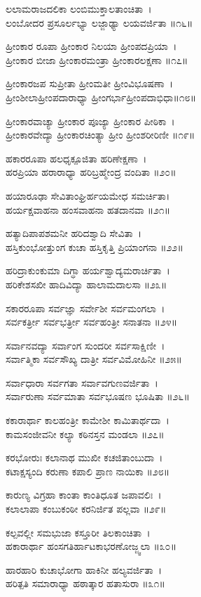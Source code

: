 {ಲಲಾಮರಾಜದಲಿಕಾ ಲಂಬಿಮುಕ್ತಾಲತಾಂಚಿತಾ~।\\
ಲಂಬೋದರ ಪ್ರಸೂರ್ಲಭ್ಯಾ ಲಜ್ಜಾಢ್ಯಾ ಲಯವರ್ಜಿತಾ ॥೧೬॥

ಹ್ರೀಂಕಾರ ರೂಪಾ ಹ್ರೀಂಕಾರ ನಿಲಯಾ ಹ್ರೀಂಪದಪ್ರಿಯಾ~।\\
ಹ್ರೀಂಕಾರ ಬೀಜಾ ಹ್ರೀಂಕಾರಮಂತ್ರಾ ಹ್ರೀಂಕಾರಲಕ್ಷಣಾ ॥೧೭॥

ಹ್ರೀಂಕಾರಜಪ ಸುಪ್ರೀತಾ ಹ್ರೀಂಮತೀ ಹ್ರೀಂವಿಭೂಷಣಾ~।\\
ಹ್ರೀಂಶೀಲಾಹ್ರೀಂಪದಾರಾಧ್ಯಾ ಹ್ರೀಂಗರ್ಭಾಹ್ರೀಂಪದಾಭಿಧಾ॥೧೮॥

ಹ್ರೀಂಕಾರವಾಚ್ಯಾ ಹ್ರೀಂಕಾರ ಪೂಜ್ಯಾ ಹ್ರೀಂಕಾರ ಪೀಠಿಕಾ~।\\
ಹ್ರೀಂಕಾರವೇದ್ಯಾ ಹ್ರೀಂಕಾರಚಿಂತ್ಯಾ ಹ್ರೀಂ ಹ್ರೀಂಶರೀರಿಣೀ ॥೧೯॥

ಹಕಾರರೂಪಾ ಹಲಧೃಕ್ಪೂಜಿತಾ ಹರಿಣೇಕ್ಷಣಾ~।\\
ಹರಪ್ರಿಯಾ ಹರಾರಾಧ್ಯಾ ಹರಿಬ್ರಹ್ಮೇಂದ್ರ ವಂದಿತಾ ॥೨೦॥

ಹಯಾರೂಢಾ ಸೇವಿತಾಂಘ್ರಿರ್ಹಯಮೇಧ ಸಮರ್ಚಿತಾ।\\
ಹರ್ಯಕ್ಷವಾಹನಾ ಹಂಸವಾಹನಾ ಹತದಾನವಾ ॥೨೧॥

ಹತ್ಯಾದಿಪಾಪಶಮನೀ ಹರಿದಶ್ವಾದಿ ಸೇವಿತಾ~।\\
ಹಸ್ತಿಕುಂಭೋತ್ತುಂಗ ಕುಚಾ ಹಸ್ತಿಕೃತ್ತಿ ಪ್ರಿಯಾಂಗನಾ ॥೨೨॥

ಹರಿದ್ರಾಕುಂಕುಮಾ ದಿಗ್ಧಾ ಹರ್ಯಶ್ವಾದ್ಯಮರಾರ್ಚಿತಾ~।\\
ಹರಿಕೇಶಸಖೀ ಹಾದಿವಿದ್ಯಾ ಹಾಲಾಮದಾಲಸಾ ॥೨೩॥

ಸಕಾರರೂಪಾ ಸರ್ವಜ್ಞಾ ಸರ್ವೇಶೀ ಸರ್ವಮಂಗಲಾ~।\\
ಸರ್ವಕರ್ತ್ರೀ ಸರ್ವಭರ್ತ್ರೀ ಸರ್ವಹಂತ್ರೀ ಸನಾತನಾ ॥೨೪॥

ಸರ್ವಾನವದ್ಯಾ ಸರ್ವಾಂಗ ಸುಂದರೀ ಸರ್ವಸಾಕ್ಷಿಣೀ~।\\
ಸರ್ವಾತ್ಮಿಕಾ ಸರ್ವಸೌಖ್ಯ ದಾತ್ರೀ ಸರ್ವವಿಮೋಹಿನೀ ॥೨೫॥

ಸರ್ವಾಧಾರಾ ಸರ್ವಗತಾ ಸರ್ವಾವಗುಣವರ್ಜಿತಾ~।\\
ಸರ್ವಾರುಣಾ ಸರ್ವಮಾತಾ ಸರ್ವಭೂಷಣ ಭೂಷಿತಾ ॥೨೬॥

ಕಕಾರಾರ್ಥಾ ಕಾಲಹಂತ್ರೀ ಕಾಮೇಶೀ ಕಾಮಿತಾರ್ಥದಾ~।\\
ಕಾಮಸಂಜೀವನೀ ಕಲ್ಯಾ ಕಠಿನಸ್ತನ ಮಂಡಲಾ ॥೨೭॥

ಕರಭೋರುಃ ಕಲಾನಾಥ ಮುಖೀ ಕಚಜಿತಾಂಬುದಾ~।\\
ಕಟಾಕ್ಷಸ್ಯಂದಿ ಕರುಣಾ ಕಪಾಲಿ ಪ್ರಾಣ ನಾಯಿಕಾ ॥೨೮॥

ಕಾರುಣ್ಯ ವಿಗ್ರಹಾ ಕಾಂತಾ ಕಾಂತಿಧೂತ ಜಪಾವಲಿಃ~।\\
ಕಲಾಲಾಪಾ ಕಂಬುಕಂಠೀ ಕರನಿರ್ಜಿತ ಪಲ್ಲವಾ ॥೨೯॥

ಕಲ್ಪವಲ್ಲೀ ಸಮಭುಜಾ ಕಸ್ತೂರೀ ತಿಲಕಾಂಚಿತಾ~।\\
ಹಕಾರಾರ್ಥಾ ಹಂಸಗತಿರ್ಹಾಟಕಾಭರಣೋಜ್ಜ್ವಲಾ ॥೩೦॥

ಹಾರಹಾರಿ ಕುಚಾಭೋಗಾ ಹಾಕಿನೀ ಹಲ್ಯವರ್ಜಿತಾ~।\\
ಹರಿತ್ಪತಿ ಸಮಾರಾಧ್ಯಾ ಹಠಾತ್ಕಾರ ಹತಾಸುರಾ ॥೩೧॥

}
